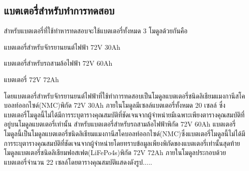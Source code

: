\subsection{แบตเตอรี่สำหรับทำการทดสอบ}
สำหรับแบตเตอรี่ที่ใช้ทำหารทดสอบจะใช้แบตเตอรี่ทั้งหมด 3 โมดูลด้วยกันคือ
\begin{itemize}
 {\item แบตเตอรี่สำหรับจักรยานยนต์ไฟฟ้า 72V 30Ah}
 {\item แบตเตอรี่สำหรับรถสามล้อไฟฟ้า 72V 60Ah}
 {\item แบตเตอรี่ 72V 72Ah}
\end{itemize}
โดยแบตเตอรี่สำหรับจักรยานยนต์ไฟฟ้าที่ใช้ทำการทดสอบเป็นโมดูลแบตเตอรี่ชนิดลิเธียมแมงกานีสโคบอลท์ออกไซด์(NMC)พิกัด 72V 30Ah ภายในโมดูลมีเซลล์แบตเตอรี่ทั้งหมด 20 เซลล์ ซึ่งแบตเตอรี่โมดูลนี้ไม่ได้มีการระบุตารางคุณสมบัติที่ชัดเจนจากผู้จำหน่ายมีเฉพาะเพียงตารางคุณสมบัติที่อยู่บนโมดูลแบตเตอรี่เท่านั้น สำหรับแบตเตอรี่สำหรับรถสามล้อไฟฟ้าพิกัด 72V 60Ah แบตเตอรี่โมดูลนี้เป็นโมดูลแบตเตอรี่ชนิดลิเธียมแมงกานีสโคบอลท์ออกไซด์(NMC)ซึ่งแบตเตอรี่โมดูลนี้ไม่ได้มีการระบุตารางคุณสมบัติที่ชัดเจนจากผู้จำหน่ายโดยทราบข้อมูลเพียงพิกัดของแบตเตอรี่เท่านั้นสุดท้าย
โมดูลแบตเตอรี่ชนิดลิเธียมฟอสเฟต(LiFePo4s)พิกัด 72V 72Ah ภายในโมดูลประกอบด้วยแบตเตอรี่จำนวน 22 เซลล์โดยตารางคุณสมบัติแสดงดังรูป.....

